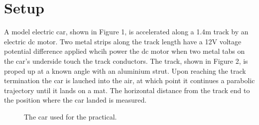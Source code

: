 \documentclass[a4paper]{article}
\begin{document}
\section{Setup}
A model electric car, shown in Figure 1, is accelerated along a 1.4$\si{\meter}$ track by an electric dc motor. Two metal strips along the track length have a 12$\si{\volt}$ voltage potential difference applied whcih power the dc motor when two metal tabs on the car's underside touch the track conductors. The track, shown in Figure 2, is proped up at a known angle with an aluminium strut. Upon reaching the track termination the car is lauched into the air, at which point it continues a parabolic trajectory until it lands on a mat. The horizontal distance from the track end to the position where the car landed is measured.
\begin{figure}[h]
	\begin{minipage}[t]{0.45\textwidth}
		\centering
		\caption{The car used for the practical.}
	\end{minipage}
	\hspace{1cm}
	\begin{minipage}[t]{0.45\textwidth}
		\centering

\end{minipage}
\end{figure}
\end{document}
